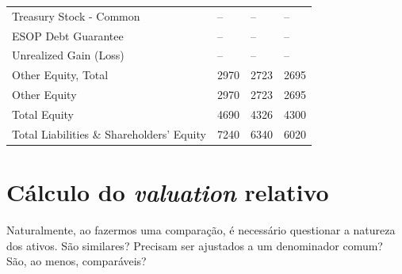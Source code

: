 \documentclass[grad,numbers]{coppe}
\begin{document}
\begin{longtable}[t]{llll}
  \hspace{1em}Treasury Stock - Common & -- & -- & --\\
  \hspace{1em}ESOP Debt Guarantee & -- & -- & --\\
  \hspace{1em}Unrealized Gain (Loss) & -- & -- & --\\
  \hspace{1em}Other Equity, Total & 2970 & 2723 & 2695\\
  \hspace{1em}\hspace{1em}Other Equity & 2970 & 2723 & 2695\\
  \hspace{1em}Total Equity & 4690 & 4326 & 4300\\
  \hspace{1em}Total Liabilities \& Shareholders' Equity & 7240 & 6340 & 6020\\*
  \end{longtable}
  \endgroup{}

  \hypertarget{cuxe1lculo-do-valuation-relativo}{%
  \section{\texorpdfstring{Cálculo do \emph{valuation} relativo}{Cálculo do valuation relativo}}\label{cuxe1lculo-do-valuation-relativo}}

  Naturalmente, ao fazermos uma comparação, é necessário questionar a natureza dos ativos. São similares? Precisam ser ajustados a um denominador comum? São, ao menos, comparáveis?
\end{document}
